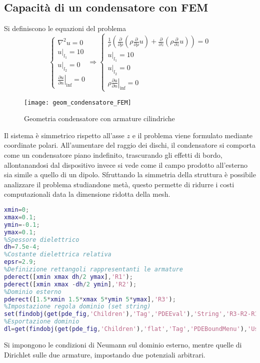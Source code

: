 \subsection{Capacità di un condensatore con FEM}
Si definiscono le equazioni del problema
$$
\begin{cases}
\nabla^2u = 0\\
\left. u\right|_{l_1} = 10\\
\left. u\right|_{l_2} = 0\\
\left.\frac{\partial u}{\partial n}\right|_{\text{inf}} = 0
\end{cases}
\Rightarrow
\begin{cases}
\frac{1}{\rho}\left(\frac{\partial}{\partial \rho}\left(\rho\frac{\partial}{\partial\rho}u\right)+
\frac{\partial}{\partial z}\left(\rho\frac{\partial}{\partial z}u\right)\right)=0\\
\left. u\right|_{l_1} = 10\\
\left. u\right|_{l_2} = 0 \\
\rho\left.\frac{\partial u}{\partial n}\right|_{\text{inf}} = 0
\end{cases}
$$
\begin{figure}[H]
\centering
\texttt{[image: geom\_condensatore\_FEM]}
\caption{Geometria condensatore con armature cilindriche}
\end{figure}
Il sistema è simmetrico rispetto all'asse $z$ e il problema
viene formulato mediante coordinate polari.
All'aumentare del raggio dei dischi, il condensatore si comporta come
un condensatore piano indefinito, trascurando gli effetti di bordo,
allontanandosi dal dispositivo invece si vede come il campo prodotto
all'esterno sia simile a quello di un dipolo.
\newpage
Sfruttando la simmetria della struttura è possibile analizzare il problema
studiandone metà, questo permette di ridurre i costi computazionali data la
dimensione ridotta della mesh.
\begin{lstlisting}[style=Matlab-editor,language = Matlab]
%definizione coordinate
xmin=0;
xmax=0.1;
ymin=-0.1;
ymax=0.1;
%Spessore dielettrico
dh=7.5e-4;
%Costante dielettrica relativa
epsr=2.9;
%Definizione rettangoli rappresentanti le armature
pderect([xmin xmax dh/2 ymax],'R1');
pderect([xmin xmax -dh/2 ymin],'R2');
%Dominio esterno
pderect([1.5*xmin 1.5*xmax 5*ymin 5*ymax],'R3');
%Impostazione regola dominio (set string)
set(findobj(get(pde_fig,'Children'),'Tag','PDEEval'),'String','R3-R2-R1');
%Esportazione dominio
dl=get(findobj(get(pde_fig,'Children'),'flat','Tag','PDEBoundMenu'),'UserData');
\end{lstlisting}
Si impongono le condizioni di Neumann sul dominio esterno, mentre quelle di 
Dirichlet sulle due armature, impostando due potenziali arbitrari.

